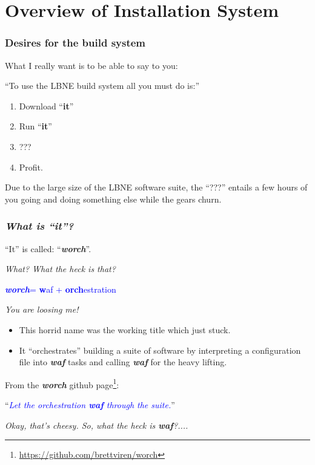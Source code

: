 \documentclass[xcolor=dvipsnames]{beamer}
\newcommand{\app}[1]{\textbf{\textit{#1}}\xspace}
\def\waf{\app{waf}}
\def\worch{\app{worch}}
\begin{document}
\section{Overview of Installation System}

\begin{frame}
\tableofcontents[
currentsection,currentsubsection,
hideothersubsections,sectionstyle=show/shaded,
] 
\end{frame}

\begin{frame}
  \frametitle{Desires for the build system}
  What I really want is to be able to say to you:

  ``To use the LBNE build system all you must do is:''
  \vspace{5mm}
  \begin{enumerate}
  \item Download ``\textbf{it}''
  \item Run ``\textbf{it}''
  \item ???
  \item Profit.
  \end{enumerate}

  \vspace{5mm}

  Due to the large size of the LBNE software suite, the ``???''
  entails a few hours of you going and doing something else while the
  gears churn.
  
\end{frame}

\begin{frame}
  \frametitle{\textit{What is ``\textbf{it}''?}}
  ``It'' is called: ``\worch''.

  \vspace{4mm}
  \textit{What?  What the heck is that?}
  \begin{center}
    \textcolor{blue}{\worch = \textbf{w}af + \textbf{orch}estration}
  \end{center}

  \textit{You are loosing me!}

  \begin{itemize}
  \item This horrid name was the working title which just stuck.
  \item It ``orchestrates'' building a suite of software by
    interpreting a configuration file into \waf tasks and calling \waf
    for the heavy lifting.
  \end{itemize}
  From the \worch github page\footnote{\url{https://github.com/brettviren/worch}}:
  \begin{center}
    ``\textcolor{blue}{\textit{Let the orchestration \waf through the suite.}}''
  \end{center}
  \textit{Okay, that's cheesy.  So, what the heck is \waf?....}
\end{frame}
\end{document}
